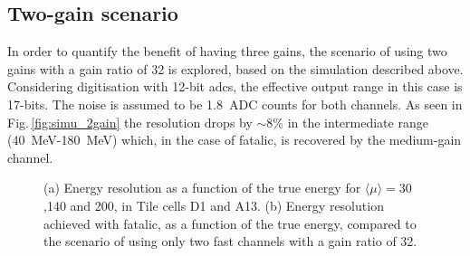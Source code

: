 \subsection{Two-gain scenario}
\label{sec:2gain}

In order to quantify the benefit of having three gains, the scenario of using two gains with a gain ratio of 32
is explored, based on the simulation described above. Considering digitisation with 12-bit \glspl{adc}, the effective 
output range in this case is 17-bits. The noise is assumed to be \SI{1.8}{ADC} counts for both channels. As seen in 
Fig.\,\ref{fig:simu_2gain} the resolution drops by $\sim$8\% in the intermediate range (\SI{40}{MeV}-\SI{180}{MeV})
which, in the case of \gls{fatalic}, is recovered by the medium-gain channel.

\clearpage

\begin{figure}[h]
  \centering
  \caption{(a) Energy resolution as a function of the true energy for $\langle\mu\rangle=30$,140 and 200, in Tile cells 
           D1 and A13. (b) Energy resolution achieved with \gls{fatalic}, as a function of the true energy, compared to 
           the scenario of using only two fast channels with a gain ratio of 32.\label{fig:simu2}}
\end{figure}
